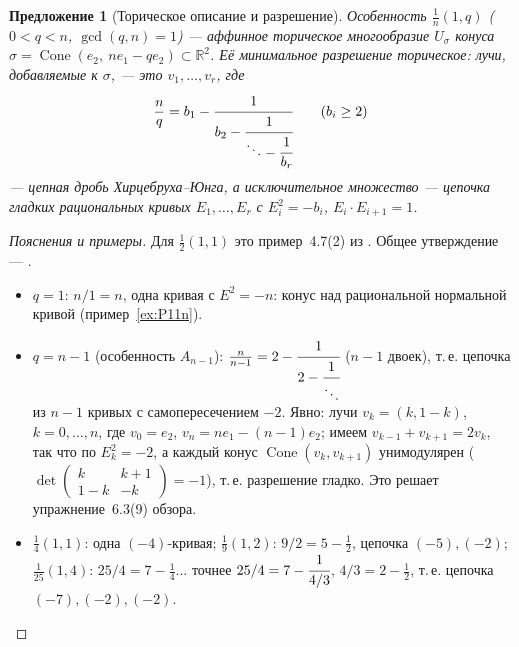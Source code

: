 \documentclass[11pt,a4paper]{article}
\theoremstyle{plain}
\newtheorem{proposition}[theorem]{Предложение}
\theoremstyle{definition}
\theoremstyle{remark}
\newcommand{\R}{\mathbb{R}}
\DeclareMathOperator{\Cone}{Cone}
\begin{document}
\begin{proposition}[Торическое описание и разрешение]\label{prop:HJ}
Особенность $\frac1n(1,q)$ ($0<q<n$, $\gcd(q,n)=1$) --- аффинное торическое многообразие
$U_\sigma$ конуса $\sigma=\Cone(e_2,\ ne_1-qe_2)\subset\R^2$. Её минимальное разрешение торическое:
лучи, добавляемые к $\sigma$, --- это $v_1,\dots,v_r$, где
\[
\frac nq=b_1-\cfrac1{b_2-\cfrac1{\ddots-\cfrac1{b_r}}}\qquad(b_i\ge2)
\]
--- \emph{цепная дробь Хирцебруха--Юнга}, а исключительное множество --- цепочка гладких
рациональных кривых $E_1,\dots,E_r$ с $E_i^2=-b_i$, $E_i\cdot E_{i+1}=1$.
\end{proposition}
\begin{proof}[Пояснения и примеры]
Для $\frac12(1,1)$ это пример~4.7(2) из \cite{AG}. Общее утверждение --- \cite[10.2]{CLS}.
\begin{itemize}
\item $q=1$: $n/1=n$, одна кривая с $E^2=-n$: конус над рациональной нормальной кривой
(пример~\ref{ex:P11n}).
\item $q=n-1$ (особенность $A_{n-1}$): $\frac n{n-1}=2-\cfrac1{2-\cfrac1{\ddots}}$ ($n-1$ двоек),
т.\,е. цепочка из $n-1$ кривых с самопересечением $-2$. Явно: лучи $v_k=(k,1-k)$, $k=0,\dots,n$,
где $v_0=e_2$, $v_n=ne_1-(n-1)e_2$; имеем $v_{k-1}+v_{k+1}=2v_k$, так что по
\cite[предложение~4.18]{AG} $E_k^2=-2$, а каждый конус $\Cone(v_{k},v_{k+1})$ унимодулярен
($\det\begin{pmatrix}k&k+1\\1-k&-k\end{pmatrix}=-1$), т.\,е. разрешение гладко. Это решает
упражнение~6.3(9) обзора.
\item $\frac14(1,1)$: одна $(-4)$-кривая; $\frac19(1,2)$: $9/2=5-\frac12$, цепочка $(-5),(-2)$;
$\frac1{25}(1,4)$: $25/4=7-\frac1{4}$... точнее $25/4=7-\cfrac1{4/3}$, $4/3=2-\frac12$, т.\,е.
цепочка $(-7),(-2),(-2)$.
\end{itemize}
\end{proof}
\end{document}
